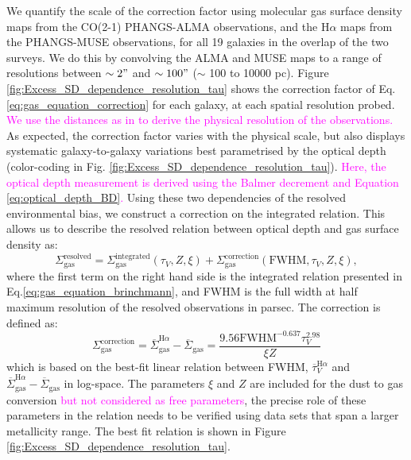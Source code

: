 \documentclass[fleqn,usenatbib]{mnras}
\begin{document}
We quantify the scale of the correction factor using molecular gas surface density maps from the CO(2-1) PHANGS-ALMA observations,  and the H$\alpha$ maps from the PHANGS-MUSE observations, for all 19 galaxies in the overlap of the two surveys. We do this by convolving the ALMA and MUSE maps to a range of resolutions between $\sim2"$ and $\sim100"$ ($\sim$ 100 to 10000 pc). Figure \ref{fig:Excess_SD_dependence_resolution_tau} shows the correction factor of Eq. \ref{eq:gas_equation_correction} for each galaxy, at each spatial resolution probed. \textcolor{magenta}{We use the distances as in \cite{leroy2021} to derive the physical resolution of the observations.} As expected, the correction factor varies with the physical scale, but also displays systematic galaxy-to-galaxy variations best parametrised by the optical depth (color-coding in Fig. \ref{fig:Excess_SD_dependence_resolution_tau}). \textcolor{magenta}{Here, the optical depth measurement is derived using the Balmer decrement and Equation \ref{eq:optical_depth_BD}.} Using these two dependencies of the resolved environmental bias, we construct a correction on the integrated relation. This allows us to describe the resolved relation between optical depth and gas surface density as:
\begin{equation}
\label{eq:resolved_gas_equation}
    \Sigma_{\textrm{gas}}^{\textrm{resolved}} = \Sigma_{\textrm{gas}}^{\textrm{integrated}}(\tau_{V}, Z, \xi) + \Sigma_{\textrm{gas}}^{\textrm{correction}}(\textrm{FWHM}, \tau_{V}, Z, \xi), 
\end{equation}
where the first term on the right hand side is the integrated relation presented in Eq.\ref{eq:gas_equation_brinchmann}, and FWHM is the full width at half maximum resolution of the resolved observations in parsec. The correction is defined as:
\begin{equation}
\label{eq:gas_equation_correction}
    \Sigma_{\textrm{gas}}^{\textrm{correction}} =
    \overline{\Sigma}_{\textrm{gas}}^{\textrm{H}\alpha} - \overline{\Sigma}_{\textrm{gas}}
    = \frac{9.56\textrm{FWHM}^{-0.637}\tau_{V}^{2.98}}{\xi Z}
\end{equation}
which is based on the best-fit linear relation between FWHM, $\overline{\tau}_{V}^{\textrm{H}\alpha}$ and $\overline{\Sigma}_{\textrm{gas}}^{\textrm{H}\alpha} - \overline{\Sigma}_{\textrm{gas}}$ in log-space. The parameters $\xi$ and $Z$ are included for the dust to gas conversion \textcolor{magenta}{but not considered as free parameters}, the precise role of these parameters in the relation needs to be verified using data sets that span a larger metallicity range. The best fit relation is shown in Figure \ref{fig:Excess_SD_dependence_resolution_tau}.
\end{document}
